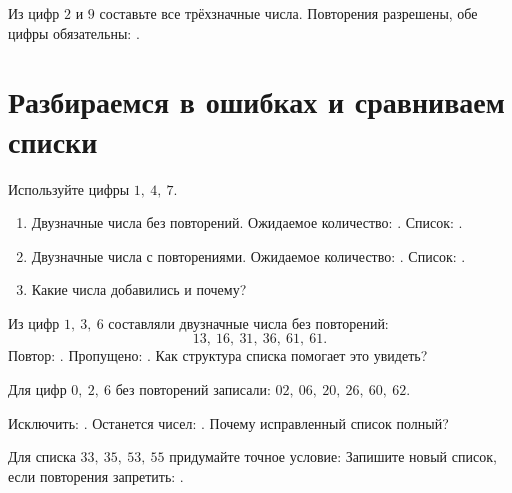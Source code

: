 \begin{practicebox}
  Из цифр \(2\) и \(9\) составьте все трёхзначные числа. Повторения разрешены,
  обе цифры обязательны:
  \answerblank[100mm].
\end{practicebox}

\newpage
\section{Разбираемся в ошибках и сравниваем списки}

\begin{practicebox}
  Используйте цифры \(1,\ 4,\ 7\).
  \begin{enumerate}[label=\textbf{\arabic*.}]
    \item Двузначные числа без повторений. Ожидаемое количество:
      \answerblank[13mm]. Список: \answerblank[82mm].
    \item Двузначные числа с повторениями.
      Ожидаемое количество: \answerblank[13mm]. Список:
      \answerblank[82mm].
    \item Какие числа добавились и почему?
  \end{enumerate}
\end{practicebox}

\begin{warningbox}
  Из цифр \(1,\ 3,\ 6\) составляли двузначные числа без повторений:
  \[
    13,\ 16,\ 31,\ 36,\ 61,\ 61.
  \]
  Повтор: \answerblank[15mm]. Пропущено: \answerblank[15mm].
  Как структура списка помогает это увидеть?
\end{warningbox}

\begin{warningbox}
  Для цифр \(0,\ 2,\ 6\) без повторений записали:
  \(02,\ 06,\ 20,\ 26,\ 60,\ 62\).

  Исключить: \answerblank[30mm]. Останется чисел: \answerblank[13mm].
  Почему исправленный список полный?
\end{warningbox}

\begin{practicebox}
  Для списка \(33,\ 35,\ 53,\ 55\) придумайте точное условие:
  Запишите новый список, если повторения запретить: \answerblank[48mm].
\end{practicebox}

